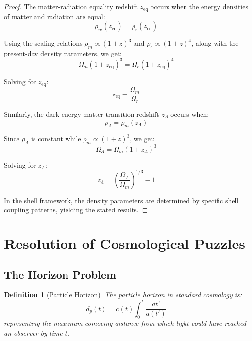 \documentclass[12pt,a4paper]{article}
\newtheorem{definition}{Definition}[section]
\begin{document}
\begin{proof}
The matter-radiation equality redshift $z_{\text{eq}}$ occurs when the energy densities of matter and radiation are equal:
\begin{equation}
\rho_m(z_{\text{eq}}) = \rho_r(z_{\text{eq}})
\end{equation}

Using the scaling relations $\rho_m \propto (1+z)^3$ and $\rho_r \propto (1+z)^4$, along with the present-day density parameters, we get:
\begin{equation}
\Omega_m(1+z_{\text{eq}})^3 = \Omega_r(1+z_{\text{eq}})^4
\end{equation}

Solving for $z_{\text{eq}}$:
\begin{equation}
z_{\text{eq}} = \frac{\Omega_m}{\Omega_r}
\end{equation}

Similarly, the dark energy-matter transition redshift $z_{\Lambda}$ occurs when:
\begin{equation}
\rho_\Lambda = \rho_m(z_{\Lambda})
\end{equation}

Since $\rho_\Lambda$ is constant while $\rho_m \propto (1+z)^3$, we get:
\begin{equation}
\Omega_\Lambda = \Omega_m(1+z_{\Lambda})^3
\end{equation}

Solving for $z_{\Lambda}$:
\begin{equation}
z_{\Lambda} = \left(\frac{\Omega_\Lambda}{\Omega_m}\right)^{1/3} - 1
\end{equation}

In the shell framework, the density parameters are determined by specific shell coupling patterns, yielding the stated results.
\end{proof}

\section{Resolution of Cosmological Puzzles}
\label{sec:cosmological-puzzles}

\subsection{The Horizon Problem}
\label{subsec:horizon-problem}

\begin{definition}[Particle Horizon]
\label{def:particle-horizon}
The particle horizon in standard cosmology is:
\begin{equation}
d_p(t) = a(t) \int_0^t \frac{dt'}{a(t')}
\end{equation}
representing the maximum comoving distance from which light could have reached an observer by time $t$.
\end{definition}
\end{document}
